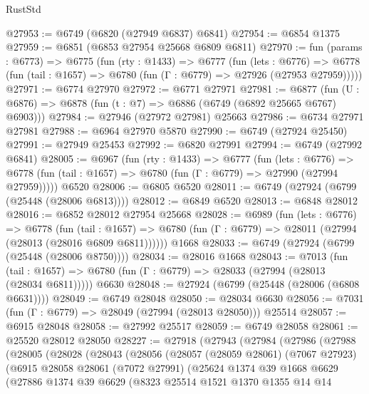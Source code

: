 \begin{lexlean}{RustStd}
\begin{coremodule}
@27953 := @6749 (@6820 (@27949 @6837) @6841)
@27954 := @6854 @1375
@27959 := @6851 (@6853 @27954 @25668 @6809 @6811)
@27970 := fun (params : @6773) =>
  @6775
    (fun (rty : @1433) =>
    @6777
      (fun (lets : @6776) =>
      @6778 (fun (tail : @1657) => @6780 (fun (Γ : @6779) => @27926 (@27953 @27959)))))
@27971 := @6774 @27970
@27972 := @6771 @27971
@27981 := @6877
    (fun (U : @6876) => @6878 (fun (t : @7) => @6886 (@6749 (@6892 @25665 @6767) @6903)))
@27984 := @27946 (@27972 @27981) @25663
@27986 := @6734 @27971 @27981
@27988 := @6964 @27970 @5870
@27990 := @6749 (@27924 @25450)
@27991 := @27949 @25453
@27992 := @6820 @27991
@27994 := @6749 (@27992 @6841)
@28005 := @6967
    (fun (rty : @1433) =>
    @6777
      (fun (lets : @6776) =>
      @6778 (fun (tail : @1657) => @6780 (fun (Γ : @6779) => @27990 (@27994 @27959)))))
    @6520
@28006 := @6805 @6520
@28011 := @6749 (@27924 (@6799 (@25448 (@28006 @6813))))
@28012 := @6849 @6520
@28013 := @6848 @28012
@28016 := @6852 @28012 @27954 @25668
@28028 := @6989
    (fun (lets : @6776) =>
    @6778
      (fun (tail : @1657) =>
      @6780 (fun (Γ : @6779) => @28011 (@27994 (@28013 (@28016 @6809 @6811))))))
    @1668
@28033 := @6749 (@27924 (@6799 (@25448 (@28006 @8750))))
@28034 := @28016 @1668
@28043 := @7013
    (fun (tail : @1657) => @6780 (fun (Γ : @6779) => @28033 (@27994 (@28013 (@28034 @6811)))))
    @6630
@28048 := @27924 (@6799 (@25448 (@28006 (@6808 @6631))))
@28049 := @6749 @28048
@28050 := @28034 @6630
@28056 := @7031 (fun (Γ : @6779) => @28049 (@27994 (@28013 @28050))) @25514
@28057 := @6915 @28048
@28058 := @27992 @25517
@28059 := @6749 @28058
@28061 := @25520 @28012 @28050
@28227 := @27918
    (@27943
      (@27984
        (@27986
          (@27988
            (@28005
              (@28028
                (@28043
                  (@28056
                    (@28057
                      (@28059 @28061)
                      (@7067 @27923)
                      (@6915
                        @28058
                        @28061
                        (@7072 @27991)
                        (@25624
                          @1374
                          @39
                          @1668
                          @6629
                          (@27886
                            @1374
                            @39
                            @6629
                            (@8323
                              @25514
                              @1521
                              @1370
                              @1355
                              @14
                              @14

\end{coremodule}
\end{lexlean}
